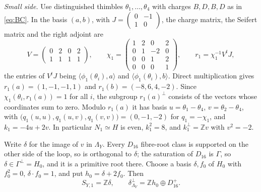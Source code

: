 \documentclass[11pt]{article}
\newcommand{\Z}{\mathbb Z}
\theoremstyle{definition}
\theoremstyle{remark}
\begin{document}
\emph{Small side.} Use distinguished thimbles
\(\theta_1,\dots,\theta_4\) with charges \(B,D,B,D\) as in
\eqref{eq:BC}. In the basis \((a,b)\), with
\(J=\left(\begin{smallmatrix}0&-1\\1&0\end{smallmatrix}\right)\), the
charge matrix, the Seifert matrix and the right adjoint are
\[
 V=\begin{pmatrix}0&2&0&2\\1&1&1&1\end{pmatrix},\qquad
 \chi_1=\begin{pmatrix}1&2&0&2\\0&1&-2&0\\0&0&1&2\\0&0&0&1\end{pmatrix},
 \qquad r_1=\chi_1^{-1}V^{t}J ,
\]
the entries of \(V^tJ\) being \(\langle\phi_1(\theta_i),a\rangle\)
and \(\langle\phi_1(\theta_i),b\rangle\). Direct multiplication gives
\(r_1(a)=(1,-1,-1,1)\) and \(r_1(b)=(-8,6,4,-2)\). Since
\(\chi_1(\theta_i,r_1(a))=1\) for all \(i\), the subgroup
\(r_1(a)^\perp\) consists of the vectors whose coordinates sum to zero. Modulo
\(r_1(a)\) it has basis \(u=\theta_1-\theta_4\),
\(v=\theta_2-\theta_4\), with
\(\bigl(q_1(u,u),q_1(u,v),q_1(v,v)\bigr)=(0,-1,-2)\) for
\(q_1=-\chi_1\), and \(k_1=-4u+2v\). In particular \(N_1\simeq H\) is
even, \(k_1^2=8\), and \(k_1^\perp=\Z v\) with \(v^2=-2\).

Write \(\delta\) for the image of \(v\) in \(\Lambda_Y\). Every
\(D_{16}\) fibre-root class is supported on the other side of the
loop, so is orthogonal to \(\delta\); the saturation of \(D_{16}\) is
\(\Gamma\), so \(\delta\in\Gamma^\perp=H_0\), and it is a primitive
root there. Choose a basis \(\delta,f_0\) of \(H_0\) with \(f_0^2=0\),
\(\delta\cdot f_0=1\), and put \(h_0=\delta+2f_0\). Then
\begin{equation}\label{eq:delta}
 S_{Y,1}=\Z\delta,\qquad \delta^\perp_{\Lambda_Y}=\Z h_0\oplus D_{16}^{+}.
\end{equation}
\end{document}

